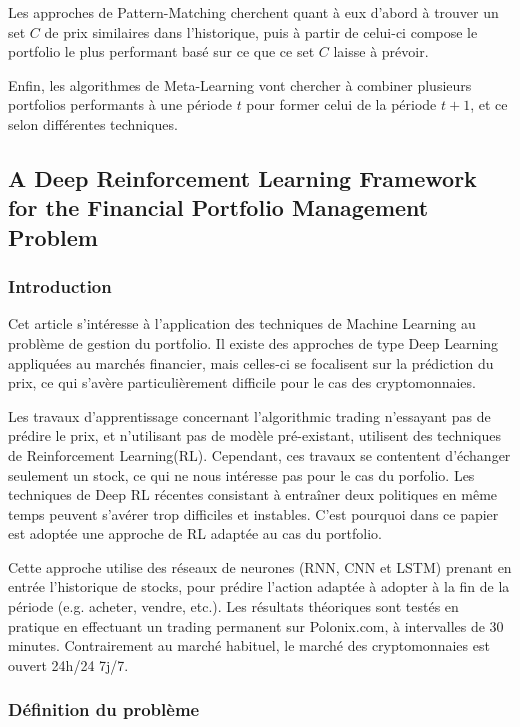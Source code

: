 \documentclass[a4paper]{article}
\begin{document}
Les approches de Pattern-Matching cherchent quant à eux d'abord à trouver un set $C$ de prix similaires dans l'historique, puis à partir de celui-ci compose le portfolio le plus performant basé sur ce que ce set $C$ laisse à prévoir.

Enfin, les algorithmes de Meta-Learning vont chercher à combiner plusieurs portfolios performants à une période $t$ pour former celui de la période $t+1$, et ce selon différentes techniques.

\subsection{A Deep Reinforcement Learning Framework for the Financial Portfolio Management Problem}

\subsubsection{Introduction}
Cet article s'intéresse à l'application des techniques de Machine Learning au problème de gestion du portfolio. Il existe des approches de type Deep Learning appliquées au marchés financier, mais celles-ci se focalisent sur la prédiction du prix, ce qui s'avère particulièrement difficile pour le cas des cryptomonnaies. 

Les travaux d'apprentissage concernant l'algorithmic trading n'essayant pas de prédire le prix, et n'utilisant pas de modèle pré-existant, utilisent des techniques de Reinforcement Learning(RL). Cependant, ces travaux se contentent d'échanger seulement un stock, ce qui ne nous intéresse pas pour le cas du porfolio. Les techniques de Deep RL récentes consistant à entraîner deux politiques en même temps peuvent s'avérer trop difficiles et instables. C'est pourquoi dans ce papier est adoptée une approche de RL adaptée au cas du portfolio. 

Cette approche utilise des réseaux de neurones (RNN, CNN et LSTM) prenant en entrée l'historique de stocks, pour prédire l'action adaptée à adopter à la fin de la période (e.g. acheter, vendre, etc.). Les résultats théoriques sont testés en pratique en effectuant un trading permanent sur Polonix.com, à intervalles de 30 minutes. Contrairement au marché habituel, le marché des cryptomonnaies est ouvert 24h/24 7j/7.

\subsubsection{Définition du problème}
\end{document}
